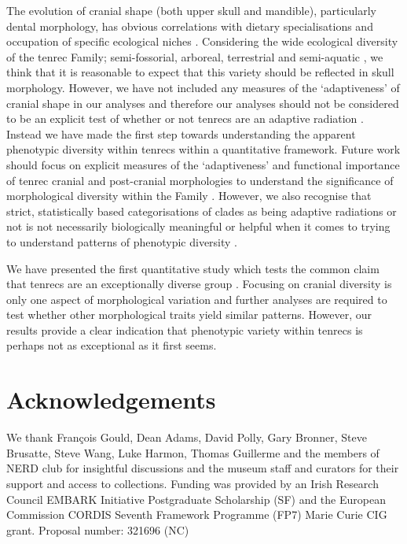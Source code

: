 \documentclass[12pt,a4paper]{article}
\begin{document}
 	The evolution of cranial shape (both upper skull and mandible), particularly dental morphology, has obvious correlations with dietary specialisations and occupation of specific ecological niches \citep[e.g.][]{Wroe2007}. Considering the wide ecological diversity of the tenrec Family; semi-fossorial, arboreal, terrestrial and semi-aquatic \citep{Soarimalala2011}, we think that it is reasonable to expect that this variety should be reflected in skull morphology. However, we have not included any measures of the `adaptiveness' of cranial shape in our analyses and therefore our analyses should not be considered to be an explicit test of whether or not tenrecs are an adaptive radiation \citep{Losos2010a}. Instead we have made the first step towards understanding the apparent phenotypic diversity within tenrecs within a quantitative framework. Future work should focus on explicit measures of the `adaptiveness' and functional importance of tenrec cranial and post-cranial morphologies to understand the significance of morphological diversity within the Family \citep[e.g.][]{Mahler2010}. However, we also recognise that strict, statistically based categorisations of clades as being adaptive radiations or not is not necessarily biologically meaningful or helpful when it comes to trying to understand patterns of phenotypic diversity \citep{Olson2009}.   


	We have presented the first quantitative study which tests the common claim that tenrecs are an exceptionally diverse group \citep{Olson2013, Soarimalala2011,Eisenberg1969}. Focusing on cranial diversity is only one aspect of morphological variation and further analyses are required to test whether other morphological traits yield similar patterns. However, our results provide a clear indication that phenotypic variety within tenrecs is perhaps not as exceptional as it first seems.   
	
\section{Acknowledgements}

	We thank Fran\c{c}ois Gould, Dean Adams, David Polly, Gary Bronner, Steve Brusatte, Steve Wang, Luke Harmon, Thomas Guillerme and the members of NERD club for insightful discussions and the museum 
	staff and curators for their support and access to collections. Funding was provided by an Irish Research Council EMBARK Initiative Postgraduate Scholarship (SF) and the European Commission CORDIS Seventh Framework Programme (FP7) Marie Curie CIG grant. Proposal number: 321696 (NC)





\end{document}
